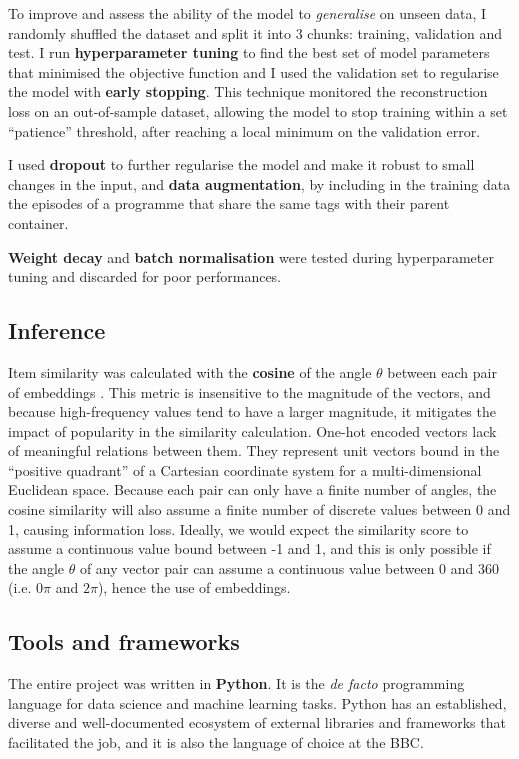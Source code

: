 To improve and assess the ability of the model to \textit{generalise} on unseen data, I randomly shuffled the dataset and split
it into 3 chunks: training, validation and test. I run \textbf{hyperparameter tuning} to find the best set of model parameters
that minimised the objective function and I used the validation set to regularise the model with \textbf{early stopping}.
This technique monitored the reconstruction loss on an out-of-sample dataset,
allowing the model to stop training within a set ``patience'' threshold, after reaching a local minimum on the validation error.

I used \textbf{dropout} to further regularise the model and make it robust to small changes in the input,
and \textbf{data augmentation}, by including in the training data the episodes of a programme that share the same tags with their
parent container.

\textbf{Weight decay} and \textbf{batch normalisation} were tested during hyperparameter tuning and discarded for poor performances.

\subsection{Inference}

Item similarity was calculated with the \textbf{cosine} of the angle $\theta$ between each pair of embeddings \cite{GoogleForDevelopers:EmbeddingSimilarity}.
This metric is insensitive to the magnitude of the vectors, and because high-frequency values tend to have a larger magnitude, it mitigates the impact of
popularity in the similarity calculation. One-hot encoded vectors lack of meaningful relations between them.
They represent unit vectors bound in the ``positive quadrant'' of a Cartesian coordinate system for a multi-dimensional Euclidean space.
Because each pair can only have a finite number of angles,
the cosine similarity will also assume a finite number of discrete values between 0 and 1, causing information
loss. Ideally, we would expect the similarity score to assume a continuous value bound between -1 and 1, and this
is only possible if the angle $\theta$ of any vector pair can assume a continuous value between 0 and 360 (i.e. $0\pi$ and $2\pi$), hence
the use of embeddings.

\subsection{Tools and frameworks}

The entire project was written in \textbf{Python}. It is the \textit{de facto} programming language for data science
and machine learning tasks. Python has an established, diverse and well-documented ecosystem of external libraries
and frameworks that facilitated the job, and it is also the language of choice at the BBC.

